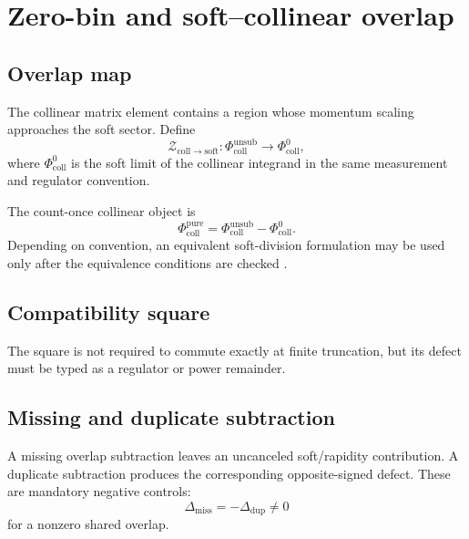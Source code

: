 \documentclass[11pt]{article}
\newcommand{\cZ}{\mathcal Z}
\newcommand{\cC}{\mathcal C}
\newcommand{\Coll}{\ensuremath{\mathrm{coll}}}
\newcommand{\Soft}{\ensuremath{\mathrm{soft}}}
\newcommand{\Ren}{\ensuremath{\mathrm{ren}}}
\newcommand{\Unsub}{\ensuremath{\mathrm{unsub}}}
\begin{document}
\section{Zero-bin and soft--collinear overlap}
\label{sec:zero-bin}

\subsection{Overlap map}

The collinear matrix element contains a region whose momentum scaling approaches the soft sector.  Define
\begin{equation}
 \cZ_{\Coll\to\Soft}:
 \Phi_{\Coll}^{\Unsub}
 \longrightarrow
 \Phi_{\Coll}^{0},
 \label{eq:zero-map}
\end{equation}
where \(\Phi_{\Coll}^{0}\) is the soft limit of the collinear integrand in the same measurement and regulator convention.

The count-once collinear object is
\begin{equation}
 \Phi_{\Coll}^{\mathrm{pure}}
 =
 \Phi_{\Coll}^{\Unsub}
 -
 \Phi_{\Coll}^{0}.
 \label{eq:pure-coll}
\end{equation}
Depending on convention, an equivalent soft-division formulation may be used only after the equivalence conditions are checked \cite{IdilbiMehen2007}.

\subsection{Compatibility square}

\begin{center}
\end{center}
The square is not required to commute exactly at finite truncation, but its defect must be typed as a regulator or power remainder.

\subsection{Missing and duplicate subtraction}

A missing overlap subtraction leaves an uncanceled soft/rapidity contribution.  A duplicate subtraction produces the corresponding opposite-signed defect.  These are mandatory negative controls:
\begin{equation}
 \Delta_{\mathrm{miss}}=-\Delta_{\mathrm{dup}}\neq0
 \label{eq:missing-duplicate}
\end{equation}
for a nonzero shared overlap.
\end{document}
